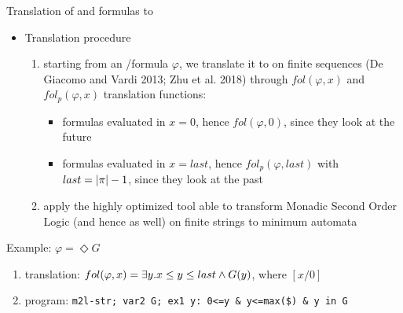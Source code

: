 \documentclass[10pt]{beamer}
\begin{document}
\begin{frame}{Translation of \LTLf and \PLTL formulas to \DFA}
	\begin{itemize}
		\item Translation procedure
		\begin{enumerate}
		\item starting from an \LTLf/\PLTL formula $\varphi$, we translate it to \FOL on finite sequences (De Giacomo and Vardi 2013; Zhu et al. 2018) through $fol(\varphi, x)$ and $fol_p(\varphi, x)$ translation functions:
	\begin{itemize}
	\item \LTLf formulas evaluated in $x = 0$, hence $fol(\varphi, 0)$, since they look at the future
	\item \PLTL formulas evaluated in $x = last$, hence $fol_p(\varphi, last)$ with $last = | \pi | - 1$, since they look at the past
	\end{itemize}
		\item apply the highly optimized tool \MONA able to transform Monadic Second Order Logic (and hence \FOL as well) on finite strings to minimum \DFA automata		
		\end{enumerate}
	\end{itemize}
	
	\begin{exampleblock}{Example: $\varphi = \Diamond G$}
	\begin{enumerate}
	\item \FOL translation: $fol(\varphi, x) = \exists y. x \leq y \leq last \wedge G(y)$, where $[x/0]$
	\item \MONA program: \texttt{m2l-str; var2 G; ex1 y: 0<=y \& y<=max(\$) \& y in G}
	\end{enumerate}
	\end{exampleblock}
\end{frame}
\end{document}
